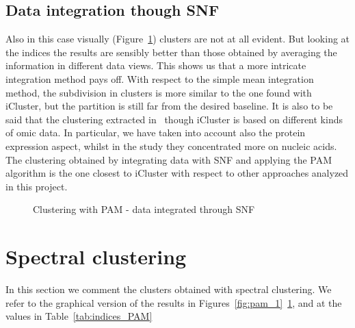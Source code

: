 \subsection{Data integration though SNF}\label{pam_SNF}
Also in this case visually (Figure~\ref{fig:pam_SNF}) clusters are not at all evident. But looking at the indices the results are sensibly better than those obtained by averaging the information in different data views. This shows us that a more intricate integration method pays off. With respect to the simple mean integration method, the subdivision in clusters is more similar to the one found with iCluster, but the partition is still far from the desired baseline. It is also to be said that the clustering extracted in~\cite{abeshouse2015molecularPRAD} though iCluster is based on different kinds of omic data. In particular, we have taken into account also the protein expression aspect, whilst in the study they concentrated more on nucleic acids. The clustering obtained by integrating data with SNF and applying the PAM algorithm is the one closest to iCluster with respect to other approaches analyzed in this project.
\begin{figure}[h]\label{fig:pam_SNF}
    \centering
    \caption{Clustering with PAM - data integrated through SNF}
\end{figure}

\section{Spectral clustering}\label{results_sc}
In this section we comment the clusters obtained with spectral clustering. We refer to the graphical version of the results in Figures~\ref{fig:pam_1}~\ref{fig:pam_SNF}, and at the values in Table~\ref{tab:indices_PAM}

